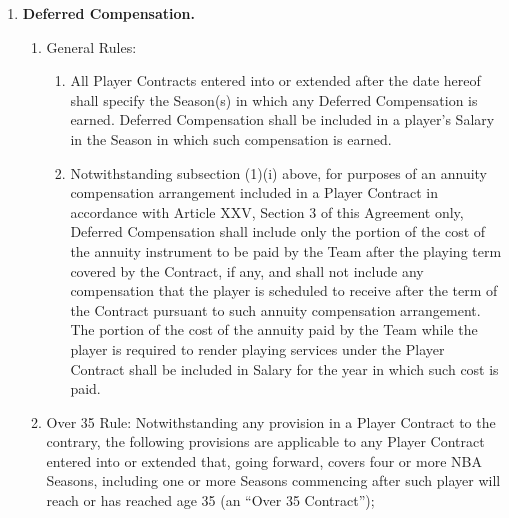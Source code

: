 \documentclass[
]{book}
\providecommand{\tightlist}{%
  \setlength{\itemsep}{0pt}\setlength{\parskip}{0pt}}
\begin{document}
\begin{enumerate}
\def\labelenumi{(\alph{enumi})}
\tightlist
\item
  \textbf{Deferred Compensation.}

  \begin{enumerate}
  \def\labelenumii{(\arabic{enumii})}
  \tightlist
  \item
    General Rules:

    \begin{enumerate}
    \def\labelenumiii{(\roman{enumiii})}
    \tightlist
    \item
      All Player Contracts entered into or extended after the date hereof shall specify the Season(s) in which any Deferred Compensation is earned. Deferred Compensation shall be included in a player's Salary in the Season in which such compensation is earned.
    \item
      Notwithstanding subsection (1)(i) above, for purposes of an annuity compensation arrangement included in a Player Contract in accordance with Article XXV, Section 3 of this Agreement only, Deferred Compensation shall include only the portion of the cost of the annuity instrument to be paid by the Team after the playing term covered by the Contract, if any, and shall not include any compensation that the player is scheduled to receive after the term of the Contract pursuant to such annuity compensation arrangement. The portion of the cost of the annuity paid by the Team while the player is required to render playing services under the Player Contract shall be included in Salary for the year in which such cost is paid.
    \end{enumerate}
  \item
    Over 35 Rule: Notwithstanding any provision in a Player Contract to the contrary, the following provisions are applicable to any Player Contract entered into or extended that, going forward, covers four or more NBA Seasons, including one or more Seasons commencing after such player will reach or has reached age 35 (an ``Over 35 Contract'');


\end{enumerate}
\end{enumerate}
\end{document}
